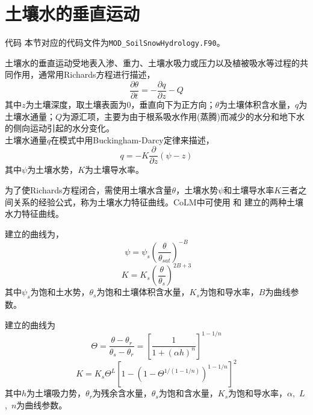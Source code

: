 \begin{enumerate}
\end{enumerate}

\section{土壤水的垂直运动}\label{sec:土壤水的垂直运动}

\begin{mymdframed}{代码}
本节对应的代码文件为\texttt{MOD\_SoilSnowHydrology.F90}。
\end{mymdframed}

土壤水的垂直运动受地表入渗、重力、土壤水吸力或压力以及植被吸水等过程的共同作用，通常用Richards方程进行描述，
\begin{equation}
\frac{\partial \theta}{\partial t}=-\frac{\partial q}{\partial z}-Q
\end{equation}
其中$z$为土壤深度，取土壤表面为0，垂直向下为正方向；$\theta$为土壤体积含水量，$q$为土壤水通量；$Q$为源汇项，主要为由于根系吸水作用(蒸腾)而减少的水分和地下水的侧向运动引起的水分变化。 \\
土壤水通量$q$在模式中用Buckingham-Darcy定律来描述，
\begin{equation}
q=-K \frac{\partial}{\partial z}(\psi-z)
\end{equation}
其中$\psi$为土壤水势，$K$为土壤导水率。

为了使Richards方程闭合，需使用土壤水含量$\theta$，土壤水势$\psi$和土壤导水率$K$三者之间关系的经验公式，称为土壤水力特征曲线。CoLM中可使用\citet{campbell1974} 和 \citet{van1980closed} 建立的两种土壤水力特征曲线。

\citet{campbell1974}建立的曲线为，
\begin{equation}\label{eq:SW_CB}
\psi=\psi_{s}\left(\frac{\theta}{\theta_{sat}}\right)^{-B}
\end{equation}
\begin{equation}\label{eq:Ks_CB}
K=K_{s}\left(\frac{\theta}{\theta_{s}}\right)^{2 B+3}
\end{equation}
其中$\psi_s$为饱和土水势，$\theta_{s}$为饱和土壤体积含水量，$K_{s}$为饱和导水率，$B$为曲线参数。

\citet{van1980closed} 建立的曲线为
\begin{equation}\label{eq:SW_VG}
    \Theta = \frac{\theta-\theta_r}{\theta_s-\theta_r} = \left[\frac{1}{1+\left(\alpha h\right)^n}\right]^{1-1/n}
\end{equation}
\begin{equation}\label{eq:Ks_VG}
    K = K_s \Theta^L \left[1-\left(1-\Theta^{1/\left(1-1/n\right)}\right)^{1-1/n}\right]^2
\end{equation}
其中$h$为土壤吸力势，$\theta_r$为残余含水量，$\theta_s$为饱和含水量，$K_{s}$为饱和导水率，$\alpha$,~$L$,~$n$为曲线参数。

